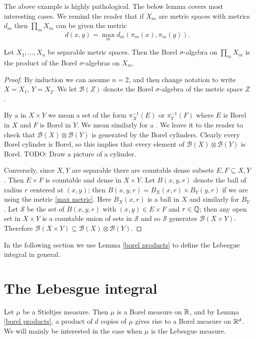 The above example is highly pathological.
The below lemma covers most interesting cases.
We remind the reader that if $X_{m}$ are metric spaces with metrics $d_{m}$ then $\prod_{m} X_{m}$ can be given the metric
\begin{equation}
\label{max metric}
d(x, y) = \max_{m} d_{m}(\pi_{m}(x), \pi_{m}(y)).
\end{equation}

\begin{lemma}
\label{borel products}
Let $X_1, \dots, X_{n}$ be separable metric spaces.
Then the Borel $\sigma$-algebra on $\prod_{m} X_{m}$ is the product of the Borel $\sigma$-algebras on $X_{m}$.
\end{lemma}
\begin{proof}
By induction we can assume $n = 2$, and then change notation to write $X = X_1$, $Y = X_2$. We let $\mathcal B(Z)$ denote the Borel $\sigma$-algebra of the metric space $Z$.

By a  in $X \times Y$ we mean a set of the form $\pi_X^{-1}(E)$ or $\pi_Y^{-1}(F)$ where $E$ is Borel in $X$ and $F$ is Borel in $Y$.
We mean similarly for a .
We leave it to the reader to check that $\mathcal B(X) \otimes \mathcal B(Y)$ is generated by the Borel cylinders.
Clearly every Borel cylinder is Borel, so this implies that every element of $\mathcal B(X) \otimes \mathcal B(Y)$ is Borel.
TODO: Draw a picture of a cylinder.

Conversely, since $X, Y$ are separable there are countable dense subsets $E, F \subseteq X, Y$.
Then $E \times F$ is countable and dense in $X \times Y$.
Let $B(x, y, r)$ denote the ball of radius $r$ centered at $(x, y)$; then $B(x, y, r) = B_X(x, r) \times B_Y(y, r)$ if we are using the metric \ref{max metric}. Here $B_X(x, r)$ is a ball in $X$ and similarly for $B_Y$.
Let $\mathcal S$ be the set of $B(x, y, r)$ with $(x, y) \in E \times F$ and $r \in \mathbb{Q}$; then any open set in $X \times Y$ is a countable union of sets in $\mathcal S$ and so $\mathcal S$ generates $\mathcal B(X \times Y)$.
Therefore $\mathcal B(X \times Y) \subseteq \mathcal B(X) \otimes \mathcal B(Y)$.
\end{proof}

In the following section we use Lemma \ref{borel products} to define the Lebesgue integral in general.

\section{The Lebesgue integral}
Let $\mu$ be a Stieltjes measure.
Then $\mu$ is a Borel measure on $\mathbb{R}$, and by Lemma \ref{borel products}, a product of $d$ copies of $\mu$ gives rise to a Borel measure on $\mathbb{R}^d$.
We will mainly be interested in the case when $\mu$ is the Lebesgue measure.

